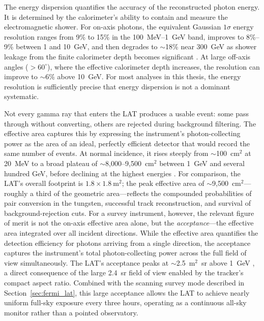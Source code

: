 The energy dispersion quantifies the accuracy of the reconstructed photon energy.
It is determined by the calorimeter's ability to contain and measure the electromagnetic shower.
For on-axis photons, the equivalent Gaussian $1\sigma$ energy resolution ranges from 9\% to 15\% in the 100~MeV--1~GeV band, improves to 8\%--9\% between 1 and 10~GeV, and then degrades to $\sim$18\% near 300~GeV as shower leakage from the finite calorimeter depth becomes significant \cite{Atwood:2009ez}.
At large off-axis angles ($>60^\circ$), where the effective calorimeter depth increases, the resolution can improve to $\sim$6\% above 10~GeV.
For most analyses in this thesis, the energy resolution is sufficiently precise that energy dispersion is not a dominant systematic.

Not every gamma ray that enters the LAT produces a usable event: some pass through without converting, others are rejected during background filtering.
The effective area captures this by expressing the instrument's photon-collecting power as the area of an ideal, perfectly efficient detector that would record the same number of events.
At normal incidence, it rises steeply from $\sim$100~cm$^2$ at 20~MeV to a broad plateau of $\sim$8,000--9,500~cm$^2$ between 1~GeV and several hundred GeV, before declining at the highest energies \cite{Atwood:2009ez}.
For comparison, the LAT's overall footprint is $1.8 \times 1.8~\mathrm{m}^2$; the peak effective area of $\sim$9,500~cm$^2$---roughly a third of the geometric area---reflects the compounded probabilities of pair conversion in the tungsten, successful track reconstruction, and survival of background-rejection cuts.
For a survey instrument, however, the relevant figure of merit is not the on-axis effective area alone, but the \emph{acceptance}---the effective area integrated over all incident directions.
While the effective area quantifies the detection efficiency for photons arriving from a single direction, the acceptance captures the instrument's total photon-collecting power across the full field of view simultaneously.
The LAT's acceptance peaks at $\sim$2.5~m$^2$~sr above 1~GeV \cite{Atwood:2009ez}, a direct consequence of the large 2.4~sr field of view enabled by the tracker's compact aspect ratio.
Combined with the scanning survey mode described in Section~\ref{sec:fermi_lat}, this large acceptance allows the LAT to achieve nearly uniform full-sky exposure every three hours, operating as a continuous all-sky monitor rather than a pointed observatory.

